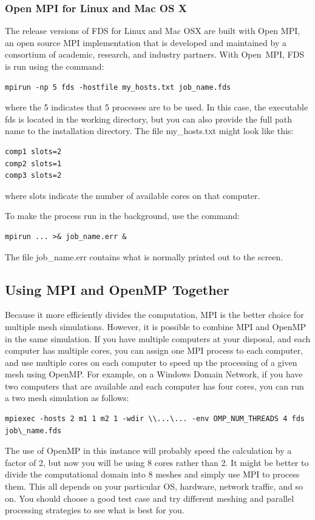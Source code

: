 \documentclass[11pt]{book}
\begin{document}
\subsubsection{Open MPI for Linux and Mac OS X}

The release versions of FDS for Linux and Mac OSX are built with Open MPI, an open source MPI implementation that is developed and maintained by a consortium of academic, research, and industry partners. With Open~MPI, FDS is run using the command:
\begin{lstlisting}
mpirun -np 5 fds -hostfile my_hosts.txt job_name.fds
\end{lstlisting}
where the 5 indicates that 5 processes are to be used. In this case, the executable {\ct fds} is located in the working directory, but you can also provide the full path name to the installation directory. The file {\ct my\_hosts.txt} might look like this:
\begin{lstlisting}
comp1 slots=2
comp2 slots=1
comp3 slots=2
\end{lstlisting}
where {\ct slots} indicate the number of available cores on that computer.

To make the process run in the background, use the command:
\begin{lstlisting}
mpirun ... >& job_name.err &
\end{lstlisting}
The file {\ct job\_name.err} contains what is normally printed out to the screen.


\subsection{Using MPI and OpenMP Together}

Because it more efficiently divides the computation, MPI is the better choice for multiple mesh simulations. However, it is possible to combine MPI and OpenMP in the same simulation. If you have multiple computers at your disposal, and each computer has multiple cores, you can assign one MPI process to each computer, and use multiple cores on each computer to speed up the processing of a given mesh using OpenMP. For example, on a Windows Domain Network, if you have two computers that are available and each computer has four cores, you can run a two mesh simulation as follows:
\begin{lstlisting}
mpiexec -hosts 2 m1 1 m2 1 -wdir \\...\... -env OMP_NUM_THREADS 4 fds job\_name.fds
\end{lstlisting}
The use of OpenMP in this instance will probably speed the calculation by a factor of 2, but now you will be using 8 cores rather than 2. It might be better to divide the computational domain into 8 meshes and simply use MPI to process them. This all depends on your particular OS, hardware, network traffic, and so on. You should choose a good test case and try different meshing and parallel processing strategies to see what is best for you.
\end{document}
